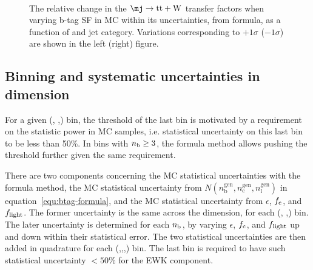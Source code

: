 \begin{figure}[!h]
  \centering
   ~~
  \\

  \caption{\label{fig:tfSyst_bsf_muToTtw-formula} The relative change in the $\mj \rightarrow \mathrm{tt+W}$ transfer
  factors when varying b-tag SF in MC within its uncertainties, from formula, 
  as a function of \scalht and jet category.
  Variations corresponding to $+1\sigma$ ($-1\sigma$) are shown in the left (right) figure. 
  }
\end{figure}


\subsection{Binning and systematic uncertainties in \mht dimension}
For a given (\njet, \nb,\scalht) bin, the threshold of the last \mht bin is 
motivated by a requirement on the statistic power in MC samples, i.e. statistical
uncertainty on this last bin to be less than 50\%. In bins with $n_{\rm b} \geq
3$, the formula method allows pushing the \mht threshold further given the
same requirement.

There are two components concerning the MC statistical uncertainties with 
the formula method, the MC statistical uncertainty from $N(n_{\textrm{b}}^{\textrm{gen}},
n_{\textrm{c}}^{\textrm{gen}}, n_{\textrm{l}}^{\textrm{gen}})$ in equation~\ref{equ:btag-formula}, and the 
MC statistical uncertainty from $\epsilon$, $f_{\rm c}$, and $f_{\rm light}$.
The former uncertainty is the same across the \nb dimension, for each (\njet,
\scalht,\mht) bin. The later uncertainty is determined for each $n_{\rm b}$, by 
varying $\epsilon$, $f_{\rm c}$, and $f_{\rm light}$ up and down within their 
statistical error. The two statistical uncertainties are then added in quadrature for each 
(\njet,\nb,\scalht,\mht) bin. The last \mht bin is required to have such
 statistical uncertainty $< 50\%$ for the EWK component.

